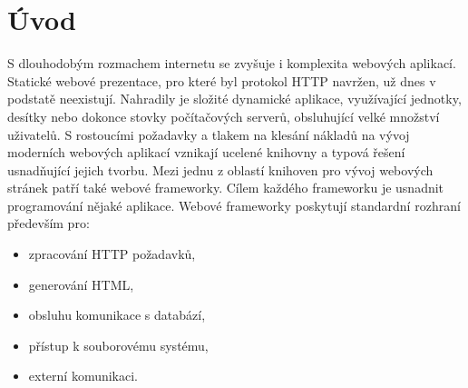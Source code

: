 
\chapter{Úvod}
S dlouhodobým rozmachem internetu se zvyšuje i komplexita webových aplikací. Statické webové prezentace, pro které byl protokol HTTP navržen, už dnes v podstatě neexistují. Nahradily je složité dynamické aplikace, využívající jednotky, desítky nebo dokonce stovky počítačových serverů, obsluhující velké množství uživatelů. S rostoucími požadavky a tlakem na klesání nákladů na vývoj moderních webových aplikací vznikají ucelené knihovny a typová řešení usnadňující jejich tvorbu. Mezi jednu z oblastí knihoven pro vývoj webových stránek patří také webové frameworky. Cílem každého frameworku je usnadnit programování nějaké aplikace. Webové frameworky poskytují standardní rozhraní především pro:
\begin{itemize}
\item zpracování HTTP požadavků,
\item generování HTML,
\item obsluhu komunikace s databází,
\item přístup k souborovému systému,
\item externí komunikaci.
\end{itemize}

